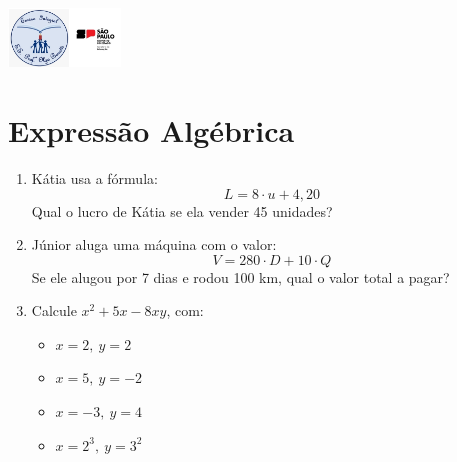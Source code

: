 \documentclass[a4paper,landscape]{article}
\begin{document}
	\fontsize{10}{15}\selectfont
	
	\noindent
	\begin{minipage}[t]{0.49\textwidth}
		\begin{center}
			\includegraphics[width=3cm]{pei.jpg}
		\end{center}
		
		\section*{Expressão Algébrica}
		
		\begin{enumerate}
			\item Kátia usa a fórmula:  
			\[ L = 8 \cdot u + 4{,}20 \]
			Qual o lucro de Kátia se ela vender 45 unidades?
			
			\item Júnior aluga uma máquina com o valor:  
			\[ V = 280 \cdot D + 10 \cdot Q \]
			Se ele alugou por 7 dias e rodou 100 km, qual o valor total a pagar?
			
			\item Calcule \(x^2 + 5x - 8xy\), com:
			\begin{itemize}[label={}]
				\item \(x = 2,\ y = 2\)
				\item \(x = 5,\ y = -2\)
				\item \(x = -3,\ y = 4\)
				\item \(x = 2^3,\ y = 3^2\)
			\end{itemize}
		\end{enumerate}
	\end{minipage}	
	\hfill	
\end{document}
